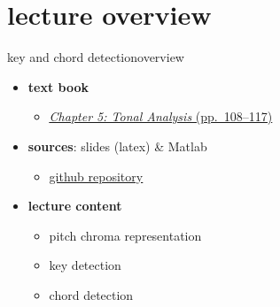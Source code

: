 

\subtitle{Part 6.6: Key and Chord Detection}


	

    \section[overview]{lecture overview}
        \begin{frame}{key and chord detection}{overview}
            \begin{itemize}
                \item   \textbf{text book}  
                    \begin{itemize}
                        \item   \href{http://ieeexplore.ieee.org/xpl/articleDetails.jsp?tp=&arnumber=6331122&}{\underline{\textit{Chapter 5: Tonal Analysis} (pp.~108--117)}}
                    \end{itemize}
                \item   \textbf{sources}: slides (latex) \& Matlab  
                    \begin{itemize}
                        \item   \href{https://github.com/alexanderlerch/ACA-Slides}{\underline{github repository}}
                    \end{itemize}
                \bigskip
                \item<2->   \textbf{lecture content}
                    \begin{itemize}
                        \item<2->   pitch chroma representation
                        \item<3->   key detection
                        \item<4->   chord detection
                    \end{itemize}
            \end{itemize}
        \end{frame}

